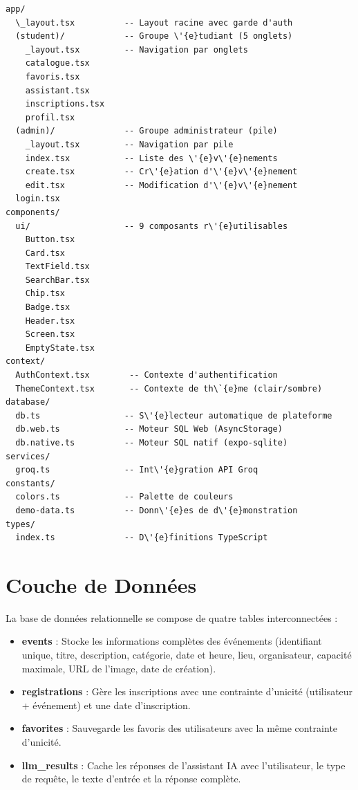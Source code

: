 \documentclass[a4paper,12pt]{report}
\begin{document}
\begin{verbatim}
app/
  \_layout.tsx          -- Layout racine avec garde d'auth
  (student)/            -- Groupe \'{e}tudiant (5 onglets)
    _layout.tsx         -- Navigation par onglets
    catalogue.tsx
    favoris.tsx
    assistant.tsx
    inscriptions.tsx
    profil.tsx
  (admin)/              -- Groupe administrateur (pile)
    _layout.tsx         -- Navigation par pile
    index.tsx           -- Liste des \'{e}v\'{e}nements
    create.tsx          -- Cr\'{e}ation d'\'{e}v\'{e}nement
    edit.tsx            -- Modification d'\'{e}v\'{e}nement
  login.tsx
components/
  ui/                   -- 9 composants r\'{e}utilisables
    Button.tsx
    Card.tsx
    TextField.tsx
    SearchBar.tsx
    Chip.tsx
    Badge.tsx
    Header.tsx
    Screen.tsx
    EmptyState.tsx
context/
  AuthContext.tsx        -- Contexte d'authentification
  ThemeContext.tsx       -- Contexte de th\`{e}me (clair/sombre)
database/
  db.ts                 -- S\'{e}lecteur automatique de plateforme
  db.web.ts             -- Moteur SQL Web (AsyncStorage)
  db.native.ts          -- Moteur SQL natif (expo-sqlite)
services/
  groq.ts               -- Int\'{e}gration API Groq
constants/
  colors.ts             -- Palette de couleurs
  demo-data.ts          -- Donn\'{e}es de d\'{e}monstration
types/
  index.ts              -- D\'{e}finitions TypeScript
\end{verbatim}

\section{Couche de Donn\'{e}es}

La base de donn\'{e}es relationnelle se compose de quatre tables interconnect\'{e}es :

\begin{itemize}[leftmargin=2em]
    \item \textbf{events} : Stocke les informations compl\`{e}tes des \'{e}v\'{e}nements (identifiant unique, titre, description, cat\'{e}gorie, date et heure, lieu, organisateur, capacit\'{e} maximale, URL de l'image, date de cr\'{e}ation).
    \item \textbf{registrations} : G\`{e}re les inscriptions avec une contrainte d'unicit\'{e} (utilisateur + \'{e}v\'{e}nement) et une date d'inscription.
    \item \textbf{favorites} : Sauvegarde les favoris des utilisateurs avec la m\^{e}me contrainte d'unicit\'{e}.
    \item \textbf{llm\_results} : Cache les r\'{e}ponses de l'assistant IA avec l'utilisateur, le type de requ\^{e}te, le texte d'entr\'{e}e et la r\'{e}ponse compl\`{e}te.
\end{itemize}
\end{document}

